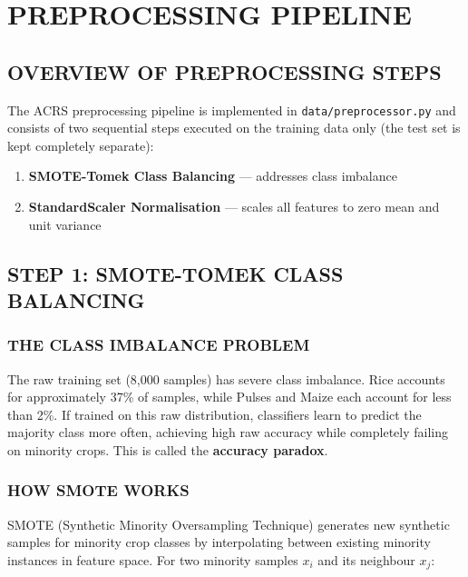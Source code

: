\documentclass[12pt,a4paper,oneside]{report}
\begin{document}
\chapter{PREPROCESSING PIPELINE}

\section{OVERVIEW OF PREPROCESSING STEPS}

The ACRS preprocessing pipeline is implemented in \texttt{data/preprocessor.py} and consists of two sequential steps executed on the training data only (the test set is kept completely separate):

\begin{enumerate}[leftmargin=*, label=\textbf{Step \arabic*.}]
  \item \textbf{SMOTE-Tomek Class Balancing} --- addresses class imbalance
  \item \textbf{StandardScaler Normalisation} --- scales all features to zero mean and unit variance
\end{enumerate}

\section{STEP 1: SMOTE-TOMEK CLASS BALANCING}

\subsection{THE CLASS IMBALANCE PROBLEM}

The raw training set (8,000 samples) has severe class imbalance. Rice accounts for approximately 37\% of samples, while Pulses and Maize each account for less than 2\%. If trained on this raw distribution, classifiers learn to predict the majority class more often, achieving high raw accuracy while completely failing on minority crops. This is called the \textbf{accuracy paradox}.

\subsection{HOW SMOTE WORKS}

SMOTE (Synthetic Minority Oversampling Technique) generates new synthetic samples for minority crop classes by interpolating between existing minority instances in feature space. For two minority samples $x_i$ and its neighbour $x_j$:
\end{document}
